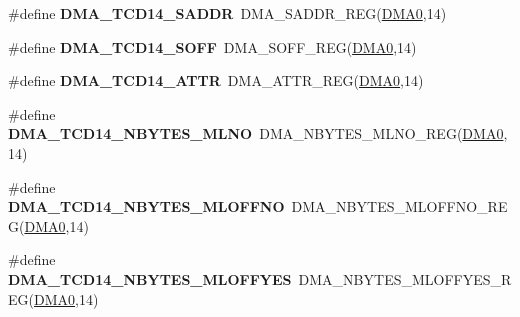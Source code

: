 \begin{DoxyCompactItemize}
\item 
\#define {\bfseries D\+M\+A\+\_\+\+T\+C\+D14\+\_\+\+S\+A\+D\+DR}~D\+M\+A\+\_\+\+S\+A\+D\+D\+R\+\_\+\+R\+EG(\hyperlink{group__DMA__Peripheral__Access__Layer_ga4103044f9ca209772f513dc694513ffb}{D\+M\+A0},14)\hypertarget{group__DMA__Register__Accessor__Macros_ga3ef5e2430d4e4dab34edc5e8767d0e46}{}\label{group__DMA__Register__Accessor__Macros_ga3ef5e2430d4e4dab34edc5e8767d0e46}

\item 
\#define {\bfseries D\+M\+A\+\_\+\+T\+C\+D14\+\_\+\+S\+O\+FF}~D\+M\+A\+\_\+\+S\+O\+F\+F\+\_\+\+R\+EG(\hyperlink{group__DMA__Peripheral__Access__Layer_ga4103044f9ca209772f513dc694513ffb}{D\+M\+A0},14)\hypertarget{group__DMA__Register__Accessor__Macros_gaddb2f2f5de001a3b004aa70b37435628}{}\label{group__DMA__Register__Accessor__Macros_gaddb2f2f5de001a3b004aa70b37435628}

\item 
\#define {\bfseries D\+M\+A\+\_\+\+T\+C\+D14\+\_\+\+A\+T\+TR}~D\+M\+A\+\_\+\+A\+T\+T\+R\+\_\+\+R\+EG(\hyperlink{group__DMA__Peripheral__Access__Layer_ga4103044f9ca209772f513dc694513ffb}{D\+M\+A0},14)\hypertarget{group__DMA__Register__Accessor__Macros_ga28f6a5c3e58f81c56650128d0d384d17}{}\label{group__DMA__Register__Accessor__Macros_ga28f6a5c3e58f81c56650128d0d384d17}

\item 
\#define {\bfseries D\+M\+A\+\_\+\+T\+C\+D14\+\_\+\+N\+B\+Y\+T\+E\+S\+\_\+\+M\+L\+NO}~D\+M\+A\+\_\+\+N\+B\+Y\+T\+E\+S\+\_\+\+M\+L\+N\+O\+\_\+\+R\+EG(\hyperlink{group__DMA__Peripheral__Access__Layer_ga4103044f9ca209772f513dc694513ffb}{D\+M\+A0},14)\hypertarget{group__DMA__Register__Accessor__Macros_gad159ef0686c8df4b74a7ec03a33daa2f}{}\label{group__DMA__Register__Accessor__Macros_gad159ef0686c8df4b74a7ec03a33daa2f}

\item 
\#define {\bfseries D\+M\+A\+\_\+\+T\+C\+D14\+\_\+\+N\+B\+Y\+T\+E\+S\+\_\+\+M\+L\+O\+F\+F\+NO}~D\+M\+A\+\_\+\+N\+B\+Y\+T\+E\+S\+\_\+\+M\+L\+O\+F\+F\+N\+O\+\_\+\+R\+EG(\hyperlink{group__DMA__Peripheral__Access__Layer_ga4103044f9ca209772f513dc694513ffb}{D\+M\+A0},14)\hypertarget{group__DMA__Register__Accessor__Macros_ga6fc9c29bae31d5e07932ea7271bd3d02}{}\label{group__DMA__Register__Accessor__Macros_ga6fc9c29bae31d5e07932ea7271bd3d02}

\item 
\#define {\bfseries D\+M\+A\+\_\+\+T\+C\+D14\+\_\+\+N\+B\+Y\+T\+E\+S\+\_\+\+M\+L\+O\+F\+F\+Y\+ES}~D\+M\+A\+\_\+\+N\+B\+Y\+T\+E\+S\+\_\+\+M\+L\+O\+F\+F\+Y\+E\+S\+\_\+\+R\+EG(\hyperlink{group__DMA__Peripheral__Access__Layer_ga4103044f9ca209772f513dc694513ffb}{D\+M\+A0},14)\hypertarget{group__DMA__Register__Accessor__Macros_ga47cbe5e87621d4d2b323561413ac05b5}{}\label{group__DMA__Register__Accessor__Macros_ga47cbe5e87621d4d2b323561413ac05b5}


\end{DoxyCompactItemize}
